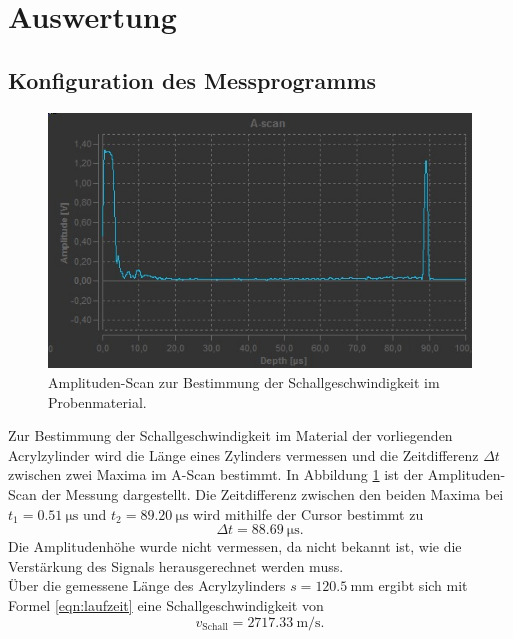 \section{Auswertung}
\label{sec:Auswertung}
\FloatBarrier
\subsection{Konfiguration des Messprogramms}
\begin{figure}
  \centering
  \includegraphics[width=\textwidth]{Messdaten/a.jpg}
  \caption{Amplituden-Scan zur Bestimmung der Schallgeschwindigkeit im Probenmaterial.}
  \label{fig:a1}
\end{figure}
Zur Bestimmung der Schallgeschwindigkeit im Material der vorliegenden Acrylzylinder wird die Länge eines Zylinders vermessen und die Zeitdifferenz $\Delta t$ zwischen zwei Maxima im A-Scan bestimmt.
In Abbildung \ref{fig:a1} ist der Amplituden-Scan der Messung dargestellt.
Die Zeitdifferenz zwischen den beiden Maxima bei $t_1=\SI{0.51}{\micro\second}$ und $t_2=\SI{89.20}{\micro\second}$ wird mithilfe der Cursor bestimmt zu
\begin{equation}
  \Delta t=\SI{88.69}{\micro\second} \text{.}
\end{equation}
Die Amplitudenhöhe wurde nicht vermessen, da nicht bekannt ist, wie die Verstärkung des Signals herausgerechnet werden muss.\\
Über die gemessene Länge des Acrylzylinders $s=\SI{120.5}{\milli\meter}$ ergibt sich mit Formel \eqref{eqn:laufzeit} eine Schallgeschwindigkeit von
\begin{equation}
  v_{\mathrm{Schall}}=\SI{2717.33}{\meter\per\second} \text{.}
\end{equation}
